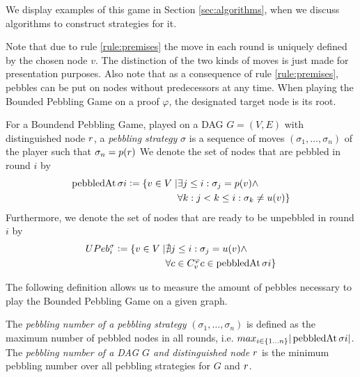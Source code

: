 We display examples of this game in Section \ref{sec:algorithms}, when we discuss algorithms to construct strategies for it.

Note that due to rule \ref{rule:premises} the move in each round is uniquely defined by the chosen node $v$.
The distinction of the two kinds of moves is just made for presentation purposes.
Also note that as a consequence of rule \ref{rule:premises}, pebbles can be put on nodes without predecessors at any time.
When playing the Bounded Pebbling Game on a proof $\varphi$, the designated target node is its root.

\begin{definition}[Strategy]
\label{def:strategy}
For a Boundend Pebbling Game, played on a DAG $G = (V,E)$ with distinguished node $r$, 
a \emph{pebbling strategy} $\sigma$ is a sequence of moves $(\sigma_1,\ldots,\sigma_n)$ of the player such that $\sigma_n = p(r)$
We denote the set of nodes that are pebbled in round $i$ by 
\begin{align*}
	\operatorname{pebbledAt}{\sigma}{i} \mathrel{\mathop:}= \{ v \in V \mid	& \exists j \leq i: \sigma_j = p(v) \wedge\\
																								&\forall k: j < k \leq i: \sigma_k \neq u(v)\}
\end{align*}
Furthermore, we denote the set of nodes that are ready to be unpebbled in round $i$ by
\begin{align*}
	UPeb^{\sigma}_{i} \mathrel{\mathop:}= \{ v \in V \mid	& \nexists j \leq i: \sigma_j = u(v) \wedge\\
																									& \forall c \in C_{v}^{\varphi} c \in \operatorname{pebbledAt}{\sigma}{i}\}
\end{align*}

\end{definition}

The following definition allows us to measure the amount of pebbles necessary to play the Bounded Pebbling Game on a given graph.

\begin{definition}
The \emph{pebbling number of a pebbling strategy} $(\sigma_1,\ldots,\sigma_n)$ is defined as the maximum number of pebbled nodes in all rounds, 
i.e. $max_{i \scriptstyle \in \{1\ldots n\} \displaystyle}|\operatorname{pebbledAt}{\sigma}{i}|$.
The \emph{pebbling number of a DAG $G$ and distinguished node $r$} is the minimum pebbling number over all pebbling strategies for $G$ and $r$.
\end{definition}

